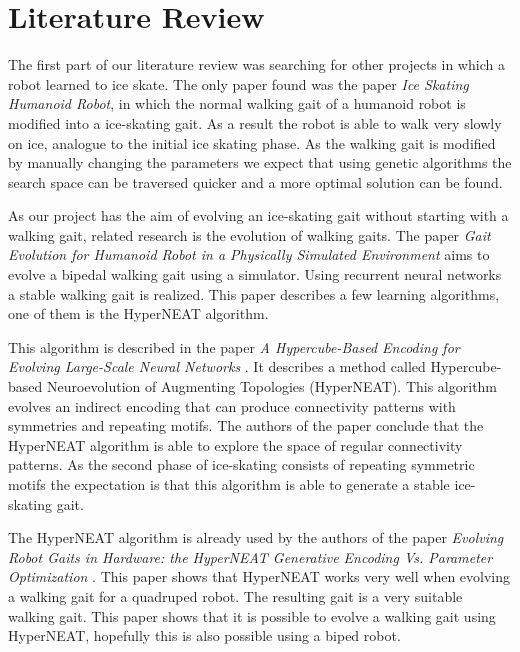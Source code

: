 \documentclass[10pt]{article}
\begin{document}
\section{Literature Review}
The first part of our literature review was searching for other projects in which a robot learned to ice skate. The only paper found was the paper \emph{Ice Skating Humanoid Robot}\cite{springerlink:10.1007/978-3-642-32527-4_19}, in which the normal walking gait of a humanoid robot is modified into a ice-skating gait. As a result the robot is able to walk very slowly on ice, analogue to the initial ice skating phase. As the walking gait is modified by manually changing the parameters we expect that using genetic algorithms the search space can be traversed quicker and a more optimal solution can be found.

As our project has the aim of evolving an ice-skating gait without starting with a walking gait, related research is the evolution of walking gaits. The paper \emph{Gait Evolution for Humanoid Robot in a Physically Simulated Environment} \cite{springerlink:10.1007/978-3-642-22907-7_9} aims to evolve a bipedal walking gait using a simulator. Using recurrent neural networks a stable walking gait is realized. This paper describes a few learning algorithms, one of them is the HyperNEAT algorithm.

This algorithm is described in the paper \emph{A Hypercube-Based Encoding for Evolving Large-Scale Neural Networks} \cite{mitpress:hypercubebasedencoding}. It describes a method called Hypercube-based Neuroevolution of Augmenting Topologies (HyperNEAT). This algorithm evolves an indirect encoding that can produce connectivity patterns with symmetries and repeating motifs. The authors of the paper conclude that the HyperNEAT algorithm is able to explore the space of regular connectivity patterns. As the second phase of ice-skating consists of repeating symmetric motifs the expectation is that this algorithm is able to generate a stable ice-skating gait.

The HyperNEAT algorithm is already used by the authors of the paper \emph{Evolving Robot Gaits in Hardware: the HyperNEAT Generative Encoding Vs. Parameter Optimization} \cite{Yosinski2011EvolvedGaits}. This paper shows that HyperNEAT works very well when evolving a walking gait for a quadruped robot. The resulting gait is a very suitable walking gait. This paper shows that it is possible to evolve a walking gait using HyperNEAT, hopefully this is also possible using a biped robot.
\end{document}
